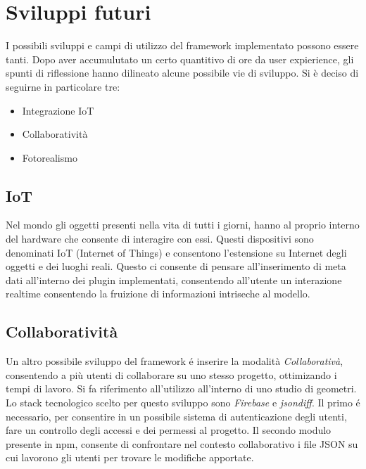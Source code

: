 \section{Sviluppi futuri}
\label{sec:conclusions_section_2}

I possibili sviluppi e campi di utilizzo del framework implementato possono essere tanti. Dopo aver accumulutato
un certo quantitivo di ore da user expierience, gli spunti di riflessione hanno dilineato alcune possibile vie di sviluppo.
Si \`e deciso di seguirne in particolare tre:
\begin{itemize}
\item Integrazione IoT
\item Collaboratività
\item Fotorealismo
\end{itemize}
\newpage

\subsection{IoT}
\label{sec:conclusions_section_2_sub_1}
Nel mondo gli oggetti presenti nella vita di tutti i giorni, hanno al proprio interno del hardware che consente di interagire
con essi. Questi dispositivi sono denominati IoT (Internet of Things) e consentono l'estensione su Internet degli oggetti e dei
luoghi reali. Questo ci consente di pensare all'inserimento di meta dati all'interno dei plugin implementati,
consentendo all'utente un interazione realtime consentendo la fruizione di informazioni intriseche al modello.

\newpage

\subsection{Collaboratività}
\label{sec:conclusions_section_2_sub_2}
Un altro possibile sviluppo del framework \'e inserire la modalità \emph{Collaborativà}, consentendo a più utenti
di collaborare su uno stesso progetto, ottimizando i tempi di lavoro. Si fa riferimento
all'utilizzo all'interno di uno studio di geometri. Lo stack tecnologico scelto per questo sviluppo sono
\emph{Firebase} e \emph{jsondiff}. Il primo \'e necessario, per consentire in un possibile sistema di autenticazione degli utenti,
fare un controllo degli accessi e dei permessi al progetto.
Il secondo modulo presente in npm, consente di confrontare nel contesto collaborativo i file JSON su cui lavorono
gli utenti per trovare le modifiche apportate.

